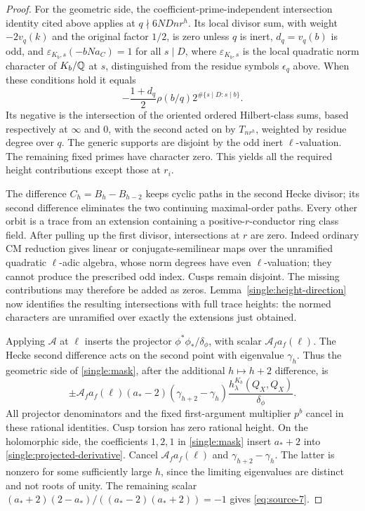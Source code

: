 \begin{proof}
For the geometric side, the coefficient-prime-independent
intersection identity cited above applies at
\(q\nmid6NDnr^h\).  Its local divisor sum, with weight
\(-2v_q(k)\) and the original factor \(1/2\), is zero unless
\(q\) is inert, \(d_q=v_q(b)\) is odd, and
\(\varepsilon_{K_b,s}(-bNa_C)=1\) for all \(s\mid D\), where
\(\varepsilon_{K_b,s}\) is the local quadratic norm character
of \(K_b/\mathbb Q\) at \(s\), distinguished from the residue symbols
\(\epsilon_q\) above.
When these conditions hold it equals
\[
 -\frac{1+d_q}{2}\rho(b/q)
                   2^{\#\{s\mid D:s\mid b\}}.
\]
Its negative is the intersection of the oriented ordered
Hilbert-class sums, based respectively at \(\infty\) and
\(0\), with the second acted on by \(T_{nr^h}\), weighted by
residue degree over \(q\).  The generic supports are disjoint
by the odd inert \(\ell\)-valuation.  The remaining fixed
primes have character zero.  This yields all the required
height contributions except those at \(r_i\).

The difference \(C_h=B_h-B_{h-2}\) keeps cyclic paths in the
second Hecke divisor; its second difference eliminates the two
continuing maximal-order paths.  Every other orbit is a trace
from an extension containing a positive-\(r\)-conductor ring
class field.  After pulling up the first divisor, intersections
at \(r\) are zero.  Indeed ordinary CM reduction gives linear
or conjugate-semilinear maps over the unramified quadratic
\(\ell\)-adic algebra, whose norm degrees have even
\(\ell\)-valuation; they cannot produce the prescribed odd
index.  Cusps remain disjoint.  The missing contributions may
therefore be added as zeros.  Lemma~\ref{single:height-direction}
now identifies the resulting intersections with full trace
heights: the normed characters are unramified over exactly the
extensions just obtained.

Applying \(\mathcal A\) at \(\ell\) inserts the projector
\(\phi^*\phi_*/\delta_\phi\), with scalar
\(\mathcal A_fa_f(\ell)\).  The Hecke second difference acts
on the second point with eigenvalue \(\gamma_h\).  Thus the
geometric side of \eqref{single:mask}, after the additional
\(h\mapsto h+2\) difference, is
\[
 \pm\mathcal A_fa_f(\ell)(a_*-2)(\gamma_{h+2}-\gamma_h)
                    \frac{h_\lambda^{K_b}(Q_X,Q_X)}{\delta_\phi}.
\]
All projector denominators and the fixed first-argument
multiplier \(p^b\) cancel in these rational identities.
Cusp torsion has zero rational height.  On the holomorphic
side, the coefficients \(1,2,1\) in \eqref{single:mask}
insert \(a_*+2\) into \eqref{single:projected-derivative}.
Cancel \(\mathcal A_fa_f(\ell)\) and
\(\gamma_{h+2}-\gamma_h\).  The latter is nonzero for some
sufficiently large \(h\), since the limiting eigenvalues are
distinct and not roots of unity.  The remaining scalar
\((a_*+2)(2-a_*)/((a_*-2)(a_*+2))=-1\) gives
\eqref{eq:source-7}.
\end{proof}

